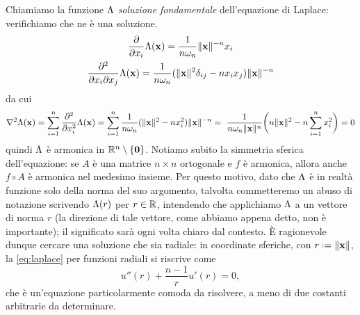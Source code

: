 Chiamiamo la funzione $\Lambda$ \emph{soluzione fondamentale} dell'equazione di Laplace: verifichiamo che ne è una soluzione.
\begin{equation}
    \begin{gathered}
        \frac{\partial {}}{\partial {x_i}}\Lambda(\mathbf{x})=\frac1{n\omega_n}\lVert\mathbf{x}\rVert^{-n}x_i\\
        \frac{\partial^2}{\partial x_i\partial x_j}\Lambda(\mathbf{x})=\frac1{n\omega_n}(\lVert\mathbf{x}\rVert^2\delta_{ij}-nx_ix_j)\lVert\mathbf{x}\rVert^{-n}
    \end{gathered}
\end{equation}
da cui
\begin{multline}
    \nabla^2\Lambda(\mathbf{x})=
    \sum_{i=1}^n\frac{\partial^2}{\partial x_i^2}\Lambda(\mathbf{x})=
    \sum_{i=1}^n\frac1{n\omega_n}(\lVert\mathbf{x}\rVert^2-nx_i^2)\lVert\mathbf{x}\rVert^{-n}=\
    \frac1{n\omega_n\lVert\mathbf{x}\rVert^n}\biggl(n\lVert\mathbf{x}\rVert^2-n\sum_{i=1}^nx_i^2\biggr)=
    0
\end{multline}
quindi $\Lambda$ è armonica in $\mathbb{R}^n\setminus\{\mathbf{0}\}$.
Notiamo subito la simmetria sferica dell'equazione: se $A$ è una matrice $n\times n$ ortogonale e $f$ è armonica, allora anche $f\circ A$ è armonica nel medesimo insieme.
Per questo motivo, dato che $\Lambda$ è in realtà funzione solo della norma del suo argomento, talvolta commetteremo un abuso di notazione scrivendo $\Lambda(r)$ per $r\in\mathbb{R}$, intendendo che applichiamo $\Lambda$ a un vettore di norma $r$ (la direzione di tale vettore, come abbiamo appena detto, non è importante); il significato sarà ogni volta chiaro dal contesto.
È ragionevole dunque cercare una soluzione che sia radiale: in coordinate sferiche, con $r\defeq\norm{\vec x}$, la \eqref{eq:laplace} per funzioni radiali si riscrive come
\begin{equation}
    u''(r)+\frac{n-1}{r}u'(r)=0,
\end{equation}
che è un'equazione particolarmente comoda da risolvere, a meno di due costanti arbitrarie da determinare.

